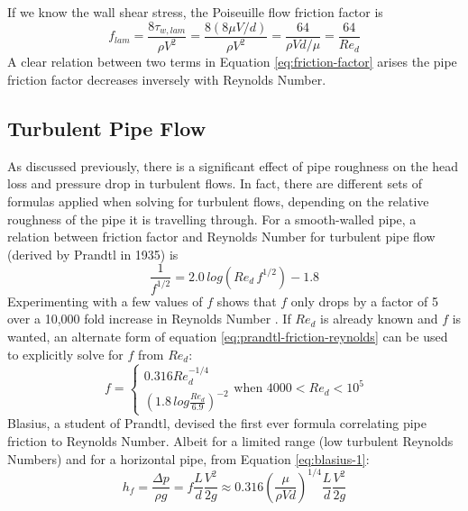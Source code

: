 \documentclass[11pt]{article} %
\numberwithin{equation}{section} %
\begin{document}
If we know the wall shear stress, the Poiseuille flow friction factor is
\begin{equation} \label{eq:friction-factor}
f_{lam} = \frac{8 \tau_{w, lam}}{\rho V^{2}} = \frac{8(8 \mu V/d)}{\rho V^{2}} = \frac{64}{\rho V d/\mu} = \frac{64}{Re_{d}}
\end{equation}	
A clear relation between two terms in Equation \ref{eq:friction-factor} arises \textemdash{} the pipe friction factor decreases inversely with Reynolds Number.
\subsection{Turbulent Pipe Flow}

As discussed previously, there is a significant effect of pipe roughness on the head loss and pressure drop in turbulent flows. In fact, there are different sets of formulas applied when solving for turbulent flows, depending on the relative roughness of the pipe it is travelling through. For a smooth-walled pipe, a relation between friction factor and Reynolds Number for turbulent pipe flow (derived by Prandtl in 1935) is \cite{fluid-mechanics}
\begin{equation} \label{eq:prandtl-friction-reynolds}
\frac{1}{f^{1/2}} = 2.0\, log({Re_{d}\, f^{1/2}}) - 1.8
\end{equation}
Experimenting with a few values of $f$ shows that $f$ only drops by a factor of 5 over a 10,000 fold increase in Reynolds Number \cite{fluid-mechanics}. If $Re_{d}$ is already known and $f$ is wanted, an alternate form of equation \ref{eq:prandtl-friction-reynolds} can be used to explicitly solve for $f$ from $Re_{d}$:
\begin{equation} \label{eq:blasius-1}
f = 
\begin{cases}
0.316 Re_{d}^{-1/4}\\%
\left( 1.8\, log \frac{Re_{d}}{6.9} \right)^{-2}%
\end{cases}
\text{when } 4000 < Re_{d} < 10^{5}
\end{equation}
Blasius, a student of Prandtl, devised the first ever formula correlating pipe friction to Reynolds Number. Albeit for a limited range (low turbulent Reynolds Numbers) and for a horizontal pipe, from Equation \ref{eq:blasius-1}:
\begin{equation} \label{eq:blasius-2}
h_{f} = \frac{\Delta p}{\rho g} = f \frac{L}{d} \frac{V^{2}}{2g} \approx 0.316 \left( \frac{\mu}{\rho V d} \right)^{1/4} \frac{L}{d} \frac{V^{2}}{2g}
\end{equation}
\end{document}
